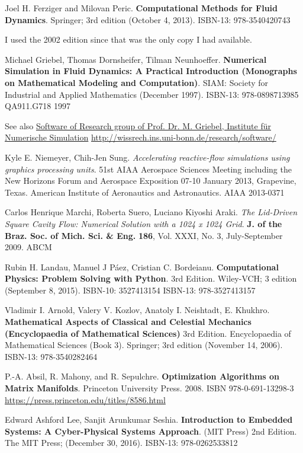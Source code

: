 \documentclass[10pt]{amsart}
\begin{document}
\begin{thebibliography}{9}
Joel H. Ferziger and Milovan Peric.  \textbf{Computational Methods for Fluid Dynamics}.  Springer; 3rd edition (October 4, 2013).  ISBN-13: 978-3540420743

I used the 2002 edition since that was the only copy I had available.  

Michael Griebel, Thomas Dornsheifer, Tilman Neunhoeffer.  \textbf{Numerical Simulation in Fluid Dynamics: A Practical Introduction (Monographs on Mathematical Modeling and Computation)}.  SIAM: Society for Industrial and Applied Mathematics (December 1997).  ISBN-13: 978-0898713985  QA911.G718  1997
  
See also \href{http://wissrech.ins.uni-bonn.de/research/software/}{Software of Research group of Prof. Dr. M. Griebel, Institute f\"{u}r Numerische Simulation} \url{http://wissrech.ins.uni-bonn.de/research/software/}

Kyle E. Niemeyer, Chih-Jen Sung.  \emph{Accelerating reactive-flow simulations using graphics processing units}.  51st AIAA Aerospace Sciences Meeting including the New Horizons Forum and Aerospace Exposition 07-10 January 2013, Grapevine, Texas. American Institute of Aeronautics and Astronautics.  AIAA 2013-0371

  Carlos Henrique Marchi, Roberta Suero, Luciano Kiyoshi Araki.  \emph{The Lid-Driven Square Cavity Flow: Numerical Solution with a 1024 x 1024 Grid}.  \textbf{J. of the Braz. Soc. of Mich. Sci. \& Eng.}  \textbf{186}, Vol. XXXI, No. 3, July-September 2009.  ABCM

Rubin H. Landau, Manuel J P\'{a}ez, Cristian C. Bordeianu.  \textbf{Computational Physics: Problem Solving with Python}.  3rd Edition.  Wiley-VCH; 3 edition (September 8, 2015).  ISBN-10: 3527413154  ISBN-13: 978-3527413157


Vladimir I. Arnold, Valery V. Kozlov, Anatoly I. Neishtadt, E. Khukhro.  \textbf{Mathematical Aspects of Classical and Celestial Mechanics (Encyclopaedia of Mathematical Sciences)} 3rd Edition.  Encyclopaedia of Mathematical Sciences (Book 3).  Springer; 3rd edition (November 14, 2006).  ISBN-13: 978-3540282464

P.-A. Absil, R. Mahony, and R. Sepulchre.  \textbf{Optimization Algorithms on Matrix Manifolds}.  Princeton University Press.  2008.  ISBN 978-0-691-13298-3
\url{https://press.princeton.edu/titles/8586.html}  


Edward Ashford Lee, Sanjit Arunkumar Seshia.   \textbf{Introduction to Embedded Systems: A Cyber-Physical Systems Approach}. (MIT Press) 2nd Edition. The MIT Press; (December 30, 2016).  ISBN-13: 978-0262533812


  
\end{thebibliography}
\end{document}
